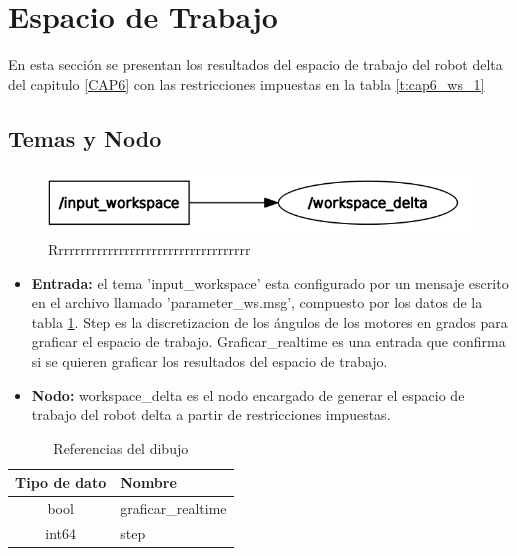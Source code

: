 \newpage


\section{Espacio de Trabajo}
        En esta sección se presentan los resultados del espacio de trabajo del robot delta del capitulo \ref{CAP6} con las restricciones impuestas en la tabla \ref{t:cap6_ws_1}
        
    \subsection{Temas y Nodo}
    
        \begin{figure}[h]
            \centering
            \includegraphics[width=1.0\linewidth]{Main/Chapter7/Images7/nodo_2.png}
            \caption{Rrrrrrrrrrrrrrrrrrrrrrrrrrrrrrrrrrrr}
            \label{f:cap7_rviz2222}
        \end{figure}    
    
    \begin{itemize}
        \item {\textbf{Entrada:}  el tema 'input\_workspace' esta configurado por un mensaje escrito en el archivo llamado 'parameter\_ws.msg', compuesto por los datos de la tabla \ref{tab:cap6_rviz_4_msg}. Step es la discretizacion de los ángulos de los motores en grados para graficar el espacio de trabajo. Graficar\_realtime es una entrada que confirma si se quieren graficar los resultados del espacio de trabajo. }
        \item {\textbf{Nodo:} workspace\_delta es el nodo encargado de generar el espacio de trabajo del robot delta a partir de restricciones impuestas.}
    \end{itemize}
    
        
            \begingroup
            \renewcommand{\arraystretch}{2.0}
            \begin{table}[H]
                \centering
                \begin{tabular}{c m{3.0cm}}
                   \hline                   \hline
                   \textbf{Tipo de dato}  & \textbf{Nombre}    \\\hline \hline 
                    bool & graficar\_realtime
                   \\\hline
                    int64 & step
                    \\\hline                   \hline
                \end{tabular}
                \caption{Referencias del dibujo}
                \label{tab:cap6_rviz_4_msg}
            \end{table}
        \endgroup    
        
